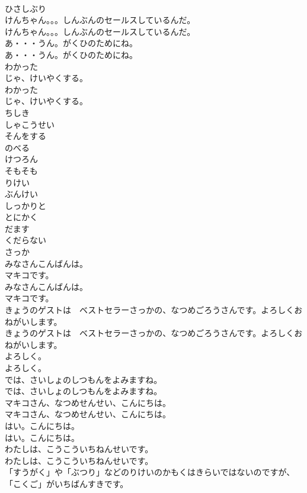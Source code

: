 \documentclass[8pt]{extreport}
\begin{document}
\begin{CJK}{UTF8}{min}
\\	ひさしぶり
\\	けんちゃん。。。しんぶんのセールスしているんだ。
\\	けんちゃん。。。しんぶんのセールスしているんだ。
\\	あ・・・うん。がくひのためにね。
\\	あ・・・うん。がくひのためにね。
\\	わかった
\\	じゃ、けいやくする。
\\	わかった
\\	じゃ、けいやくする。
\\	ちしき
\\	しゃこうせい
\\	そんをする
\\	のべる
\\	けつろん
\\	そもそも
\\	りけい
\\	ぶんけい
\\	しっかりと
\\	とにかく
\\	だます
\\	くだらない
\\	さっか
\\	みなさんこんばんは。
\\	マキコです。
\\	みなさんこんばんは。
\\	マキコです。
\\	きょうのゲストは　ベストセラーさっかの、なつめごろうさんです。よろしくおねがいします。
\\	きょうのゲストは　ベストセラーさっかの、なつめごろうさんです。よろしくおねがいします。
\\	よろしく。
\\	よろしく。
\\	では、さいしょのしつもんをよみますね。
\\	では、さいしょのしつもんをよみますね。
\\	マキコさん、なつめせんせい、こんにちは。
\\	マキコさん、なつめせんせい、こんにちは。
\\	はい。こんにちは。
\\	はい。こんにちは。
\\	わたしは、こうこういちねんせいです。
\\	わたしは、こうこういちねんせいです。
\\	「すうがく」や「ぶつり」などのりけいのかもくはきらいではないのですが、「こくご」がいちばんすきです。

\end{CJK}
\end{document}
